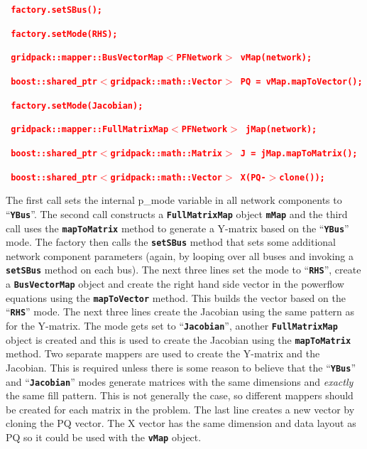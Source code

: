 \documentclass[12pt]{report} %
\begin{document}
\textcolor{red}{\texttt{\textbf{}}}

\textcolor{red}{\texttt{\textbf{  factory.setSBus();}}}

\textcolor{red}{\texttt{\textbf{  factory.setMode(RHS);}}}

\textcolor{red}{\texttt{\textbf{  gridpack::mapper::BusVectorMap$\boldsymbol{\mathrm{<}}$PFNetwork$\boldsymbol{\mathrm{>}}$ vMap(network);}}}

\textcolor{red}{\texttt{\textbf{  boost::shared\_ptr$\boldsymbol{\mathrm{<}}$gridpack::math::Vector$\boldsymbol{\mathrm{>}}$ PQ = vMap.mapToVector();}}}

\textcolor{red}{\texttt{\textbf{}}}

\textcolor{red}{\texttt{\textbf{  factory.setMode(Jacobian);}}}

\textcolor{red}{\texttt{\textbf{  gridpack::mapper::FullMatrixMap$\boldsymbol{\mathrm{<}}$PFNetwork$\boldsymbol{\mathrm{>}}$ jMap(network);}}}

\textcolor{red}{\texttt{\textbf{  boost::shared\_ptr$\boldsymbol{\mathrm{<}}$gridpack::math::Matrix$\boldsymbol{\mathrm{>}}$ J = jMap.mapToMatrix();}}}

\textcolor{red}{\texttt{\textbf{  boost::shared\_ptr$\boldsymbol{\mathrm{<}}$gridpack::math::Vector$\boldsymbol{\mathrm{>}}$ X(PQ-$\boldsymbol{\mathrm{>}}$clone());}}}

The first call sets the internal p\_mode variable in all network components to ``\texttt{\textbf{YBus}}''. The second call constructs a \texttt{\textbf{FullMatrixMap}} object \texttt{\textbf{mMap}} and the third call uses the \texttt{\textbf{mapToMatrix}} method to generate a Y-matrix based on the ``\texttt{\textbf{YBus}}'' mode. The factory then calls the \texttt{\textbf{setSBus}} method that sets some additional network component parameters (again, by looping over all buses and invoking a \texttt{\textbf{setSBus}} method on each bus). The next three lines set the mode to ``\texttt{\textbf{RHS}}'', create a \texttt{\textbf{BusVectorMap}} object and create the right hand side vector in the powerflow equations using the \texttt{\textbf{mapToVector}} method. This builds the vector based on the ``\texttt{\textbf{RHS}}'' mode. The next three lines create the Jacobian using the same pattern as for the Y-matrix. The mode gets set to ``\texttt{\textbf{Jacobian}}'', another \texttt{\textbf{FullMatrixMap}} object is created and this is used to create the Jacobian using the \texttt{\textbf{mapToMatrix}} method. Two separate mappers are used to create the Y-matrix and the Jacobian. This is required unless there is some reason to believe that the ``\texttt{\textbf{YBus}}'' and ``\texttt{\textbf{Jacobian}}'' modes generate matrices with the same dimensions and \textit{exactly} the same fill pattern. This is not generally the case, so different mappers should be created for each matrix in the problem. The last line creates a new vector by cloning the PQ vector. The X vector has the same dimension and data layout as PQ so it could be used with the \texttt{\textbf{vMap}} object.
\end{document}
